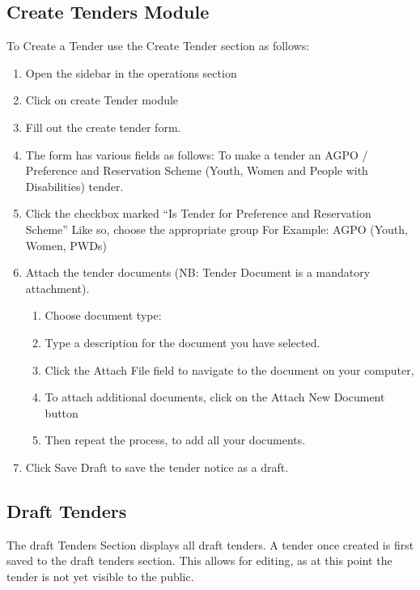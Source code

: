 \documentclass [12pt]{book}
\begin{document}
\subsection{Create Tenders Module}
To Create a Tender use the Create Tender section as follows:
\begin{enumerate}
\item 	Open the sidebar in the operations section 
\item 	Click on create Tender module
\item 	Fill out the create tender form.  
\item 	The form has various fields as follows: 
To make a tender an AGPO / Preference and Reservation Scheme (Youth, Women and People with Disabilities) tender.
\item 	Click the checkbox marked “Is Tender for Preference and Reservation Scheme”
Like so, choose the appropriate group
For Example: 
AGPO (Youth, Women, PWDs)

\item 	Attach the tender documents (NB: Tender Document is a mandatory attachment).
\begin{enumerate}
\item 	Choose document type:
 
\item 	Type a description for the document you have selected.
\item 	Click the Attach File field to navigate to the document on your computer,
 
\item 	To attach additional documents, click on the Attach New Document button
 
\item 	Then repeat the process, to add all your documents.
 
\end{enumerate}

\item 	Click Save Draft to save the tender notice as a draft.
\end{enumerate}



\subsection{Draft Tenders}
The draft Tenders Section displays all draft tenders.
A tender once created is first saved to the draft tenders section. 
This allows for editing, as at this point the tender is not yet visible to the public.
\end{document}
